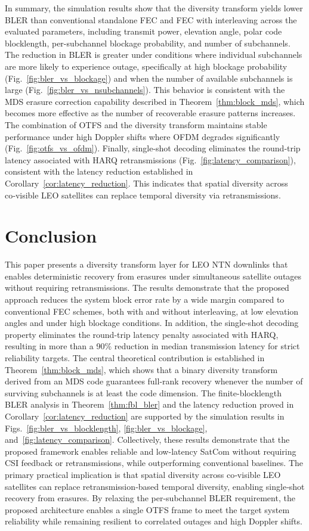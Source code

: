 \documentclass[lettersize,journal]{IEEEtran}
\begin{document}
In summary, the simulation results show that the diversity transform yields lower BLER than conventional standalone FEC and FEC with interleaving across the evaluated parameters, including transmit power, elevation angle, polar code blocklength, per-subchannel blockage probability, and number of subchannels. The reduction in BLER is greater under conditions where individual subchannels are more likely to experience outage, specifically at high blockage probability (Fig.~\ref{fig:bler_vs_blockage}) and when the number of available subchannels is large (Fig.~\ref{fig:bler_vs_nsubchannels}). This behavior is consistent with the MDS erasure correction capability described in Theorem~\ref{thm:block_mds}, which becomes more effective as the number of recoverable erasure patterns increases. The combination of OTFS and the diversity transform maintains stable performance under high Doppler shifts where OFDM degrades significantly (Fig.~\ref{fig:otfs_vs_ofdm}). Finally, single-shot decoding eliminates the round‑trip latency associated with HARQ retransmissions (Fig.~\ref{fig:latency_comparison}), consistent with the latency reduction established in Corollary~\ref{cor:latency_reduction}. This indicates that spatial diversity across co‑visible LEO satellites can replace temporal diversity via retransmissions.
\section{Conclusion}
\label{sec:conclusion}
This paper presents a diversity transform layer for LEO NTN downlinks  that enables deterministic recovery from erasures under simultaneous satellite  outages without requiring retransmissions. The results demonstrate that the proposed approach reduces the system block error rate by a wide margin compared to conventional FEC schemes, both with and without interleaving, at low elevation angles and under high blockage conditions. In addition, the single-shot decoding property eliminates the round-trip latency penalty associated with HARQ, resulting in more than a 90\% reduction in median transmission latency for strict reliability targets.
The central theoretical contribution is established in 
Theorem~\ref{thm:block_mds}, which shows that a binary diversity 
transform derived from an MDS code guarantees full-rank recovery 
whenever the number of surviving subchannels is at least the code 
dimension. The finite-blocklength BLER analysis in Theorem~\ref{thm:fbl_bler} and the latency reduction proved in Corollary~\ref{cor:latency_reduction} are supported by the simulation results in Figs.~\ref{fig:bler_vs_blocklength}, \ref{fig:bler_vs_blockage}, and~\ref{fig:latency_comparison}. Collectively, these results demonstrate that the proposed framework enables reliable and low-latency SatCom without requiring CSI feedback or retransmissions, while outperforming conventional baselines. The primary practical implication is that spatial diversity across co‑visible LEO satellites can replace retransmission‑based temporal diversity, enabling single‑shot recovery from erasures. By relaxing the per-subchannel BLER requirement, the proposed architecture enables a single OTFS frame to meet the target system reliability while remaining resilient to correlated outages and high Doppler shifts.
\end{document}
